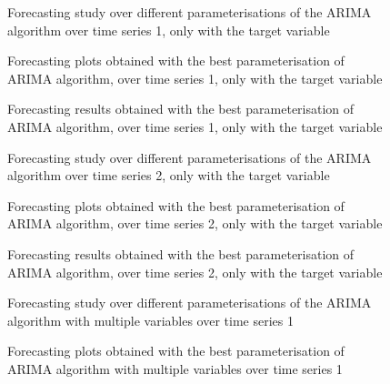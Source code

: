 \documentclass[10pt]{extarticle}
\begin{document}
\begin{figure}[H]
\caption{Forecasting study over different parameterisations of the ARIMA algorithm over time series 1, only with the target variable}
\end{figure}

\begin{figure}[H]
\caption{Forecasting plots obtained with the best parameterisation of ARIMA algorithm, over time series 1, only with the target variable}
\end{figure}

\begin{figure}[H]
\caption{Forecasting results obtained with the best parameterisation of ARIMA algorithm, over time series 1, only with the target variable}
\end{figure}

\begin{figure}[H]
\caption{Forecasting study over different parameterisations of the ARIMA algorithm over time series 2, only with the target variable}
\end{figure}

\begin{figure}[H]
\caption{Forecasting plots obtained with the best parameterisation of ARIMA algorithm, over time series 2, only with the target variable}
\end{figure}

\begin{figure}[H]
\caption{Forecasting results obtained with the best parameterisation of ARIMA algorithm, over time series 2, only with the target variable}
\end{figure}

\begin{figure}[H]
\caption{Forecasting study over different parameterisations of the ARIMA algorithm with multiple variables over time series 1}
\end{figure}

\begin{figure}[H]
\caption{Forecasting plots obtained with the best parameterisation of ARIMA algorithm with multiple variables over time series 1}
\end{figure}
\end{document}
